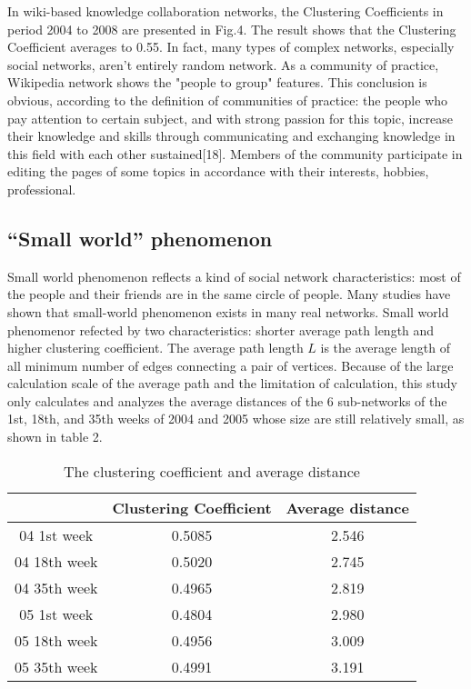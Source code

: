 \documentclass{elsarticle}
\begin{document}
In wiki-based knowledge collaboration networks, the Clustering
Coefficients in period 2004 to 2008 are presented in Fig.4. The result
shows that the Clustering Coefficient averages to 0.55. In fact, many
types of complex networks, especially social networks, aren’t entirely
random network. As a community of practice, Wikipedia network shows
the "people to group" features. This conclusion is obvious, according
to the definition of communities of practice: the people who pay
attention to certain subject, and with strong passion for this topic,
increase their knowledge and skills through communicating and
exchanging knowledge in this field with each other sustained[18].
Members of the community participate in editing the pages of some topics  in accordance with their interests, hobbies, professional. 



\subsection{“Small world” phenomenon }
\label{sec:small-world-phen}

Small world phenomenon reflects a kind of social network
characteristics: most of the people and their friends are in the same
circle of people. Many studies have shown that small-world phenomenon
exists in many real networks. Small world phenomenor refected by two
characteristics: shorter average path length and higher clustering
coefficient. The average path length $L$ is the average length of
all minimum number of edges connecting a pair of vertices. Because of
the large calculation scale of the average path and the limitation of
calculation, this study only calculates and analyzes the average
distances of the 6 sub-networks of the 1st, 18th, and 35th weeks of
2004 and 2005 whose size are still relatively small, as shown in table
2.

\begin{table}[htpb]
  \centering
 \caption{The clustering coefficient and average distance} 
 \begin{tabular}{|c|c|c|}
   \hline
    &Clustering Coefficient&Average distance\\\hline
  04 1st week&0.5085&2.546\\\hline
  04 18th week&0.5020&2.745\\\hline
  04 35th week&0.4965&2.819\\\hline
  05 1st week&0.4804&2.980\\\hline
  05 18th week&0.4956&3.009\\\hline
  05 35th week&0.4991&3.191\\\hline
   \end{tabular}
 
\end{table}
\end{document}
